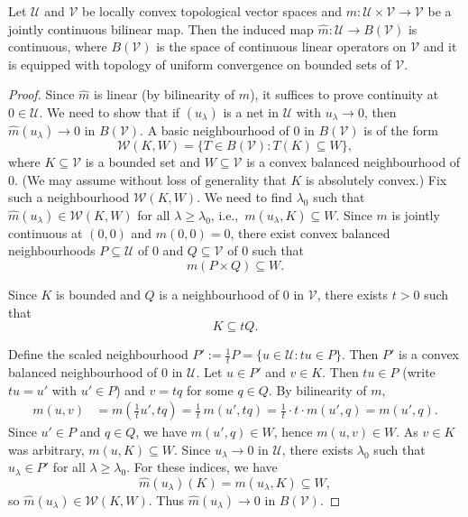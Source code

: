 \documentclass[10pt,a4paper]{amsart}
\begin{document}
	\begin{lemma}\label{biltolin}
		Let $\mathcal U$ and $\mathcal V$ be locally convex topological vector spaces and $m:\mathcal U\times \mathcal V\to \mathcal V$ be a jointly continuous bilinear map. Then the induced map $\hat m:\mathcal U\to B(\mathcal V)$ is continuous, where $B(\mathcal V)$ is the space of continuous linear operators on $\mathcal V$ and it is equipped with topology of uniform convergence on bounded sets of $\mathcal V$.
	\end{lemma}

	\begin{proof}
		Since $\widehat{m}$ is linear (by bilinearity of $m$), it suffices to prove continuity at $0\in\mathcal{U}$. 
		We need to show that if $(u_\lambda)$ is a net in $\mathcal{U}$ with $u_\lambda \to 0$, then 
		$\widehat{m}(u_\lambda)\to 0$ in $B(\mathcal V)$. 			
		A basic neighbourhood of $0$ in $B(\mathcal V)$ is of the form
		\[
		\mathcal{W}(K,W)=\bigl\{T\in B(\mathcal V):T(K)\subseteq W\bigr\},
		\]
		where $K\subseteq \mathcal{V}$ is a bounded set and $W\subseteq \mathcal{V}$ is a convex balanced neighbourhood of $0$. 
		(We may assume without loss of generality that $K$ is absolutely convex.)		
		Fix such a neighbourhood $\mathcal{W}(K,W)$. We need to find $\lambda_0$ such that 
		$\widehat{m}(u_\lambda)\in\mathcal{W}(K,W)$ for all $\lambda\ge\lambda_0$, 
		i.e.,\ $m(u_\lambda,K)\subseteq W$.	Since $m$ is jointly continuous at $(0,0)$ and $m(0,0)=0$, there exist convex balanced 
		neighbourhoods $P\subseteq \mathcal{U}$ of $0$ and $Q\subseteq \mathcal{V}$ of $0$ such that
		\[
		m(P\times Q)\subseteq W.
		\]
		
		
		Since $K$ is bounded and $Q$ is a neighbourhood of $0$ in $\mathcal{V}$, there exists $t>0$ such that
		\[
		K\subseteq tQ.
		\]
		
		
		Define the scaled neighbourhood $			P':=\frac{1}{t}P=\bigl\{u\in\mathcal{U}:tu\in P\bigr\}.$
		Then $P'$ is a convex balanced neighbourhood of $0$ in $\mathcal{U}$.	Let $u\in P'$ and $v\in K$.  
		Then $tu\in P$ (write $tu=u'$ with $u'\in P$) and $v=tq$ for some $q\in Q$. 
		By bilinearity of $m$,
		\begin{align*}
			m(u,v)
			&=m\!\left(\frac{1}{t}u',tq\right)
			=\frac{1}{t}\,m(u',tq)
			=\frac{1}{t}\cdot t\cdot m(u',q)
			=m(u',q).
		\end{align*}
		Since $u'\in P$ and $q\in Q$, we have $m(u',q)\in W$, hence $m(u,v)\in W$. 
		As $v\in K$ was arbitrary, $m(u,K)\subseteq W$.				
		Since $u_\lambda\to 0$ in $\mathcal{U}$, there exists $\lambda_0$ such that 
		$u_\lambda\in P'$ for all $\lambda\ge\lambda_0$. 
		For these indices, we have
		\[
		\widehat{m}(u_\lambda)(K)=m(u_\lambda,K)\subseteq W,
		\]
		so $\widehat{m}(u_\lambda)\in\mathcal{W}(K,W)$. 
		Thus $\widehat{m}(u_\lambda)\to 0$ in $B(\mathcal V)$.
	\end{proof}
\end{document}
